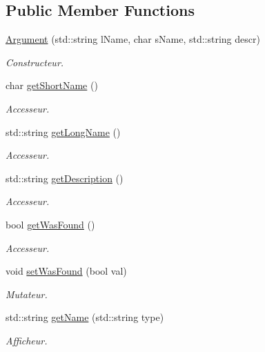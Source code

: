 \subsection*{Public Member Functions}
\begin{DoxyCompactItemize}
\item 
\hyperlink{classArgument_ae453df798ec87ee16e61c4cbc2283927}{Argument} (std\-::string l\-Name, char s\-Name, std\-::string descr)
\begin{DoxyCompactList}\small\item\em Constructeur. \end{DoxyCompactList}\item 
char \hyperlink{classArgument_a26b8be0058af34a8c4fc6d5b86cc115f}{get\-Short\-Name} ()
\begin{DoxyCompactList}\small\item\em Accesseur. \end{DoxyCompactList}\item 
std\-::string \hyperlink{classArgument_a9143acb0495de0ec95dede6706aca215}{get\-Long\-Name} ()
\begin{DoxyCompactList}\small\item\em Accesseur. \end{DoxyCompactList}\item 
std\-::string \hyperlink{classArgument_a73e6b45ca7a1049590bbb5b886c72ba5}{get\-Description} ()
\begin{DoxyCompactList}\small\item\em Accesseur. \end{DoxyCompactList}\item 
bool \hyperlink{classArgument_a5dfd49a75fd171250a4997f1605bd638}{get\-Was\-Found} ()
\begin{DoxyCompactList}\small\item\em Accesseur. \end{DoxyCompactList}\item 
void \hyperlink{classArgument_a434158cb4358b10695061128b6e658e7}{set\-Was\-Found} (bool val)
\begin{DoxyCompactList}\small\item\em Mutateur. \end{DoxyCompactList}\item 
std\-::string \hyperlink{classArgument_ac211710802002ea19b3c685028e33177}{get\-Name} (std\-::string type)
\begin{DoxyCompactList}\small\item\em Afficheur. \end{DoxyCompactList}\item 

\end{DoxyCompactItemize}
